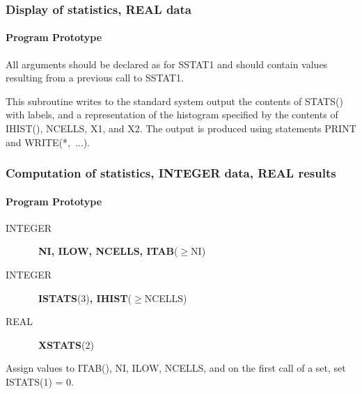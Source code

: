 \documentclass[twoside]{MATH77}
\begin{document}
\subsubsection{Display of statistics, REAL data}

\paragraph{Program Prototype}

All arguments should be declared as for SSTAT1 and should contain values
resulting from a previous call to SSTAT1.

\begin{center}
\end{center}

This subroutine writes to the standard system output the
contents of STATS() with labels, and a representation of the
histogram specified by the contents of IHIST(), NCELLS, X1, and X2.
The output is produced using statements PRINT and WRITE(*,~...).

\subsubsection{Computation of statistics, INTEGER data, REAL results}

\paragraph{Program Prototype}

\begin{description}
\item[INTEGER]  \ {\bf NI, ILOW, NCELLS}{\bf , ITAB}($\geq $NI)

\item[INTEGER]  \ {\bf ISTATS}(3){\bf , IHIST}($\geq $NCELLS)

\item[REAL]  \ {\bf XSTATS}(2)
\end{description}

Assign values to ITAB(), NI, ILOW, NCELLS, and on the first call of
a set, set ISTATS(1) = 0.

\begin{center}
\end{center}
\end{document}
